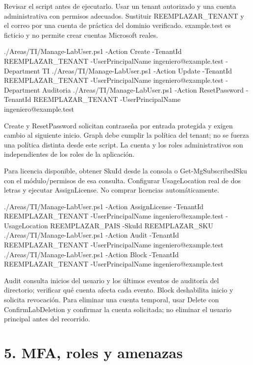 \documentclass[12pt,a4paper]{article}
\begin{document}
Revisar el script antes de ejecutarlo. Usar un tenant autorizado y una cuenta administrativa con permisos adecuados. Sustituir REEMPLAZAR\_TENANT y el correo por una cuenta de práctica del dominio verificado. \textnormal{example.test} es ficticio y no permite crear cuentas Microsoft reales.\par
{}
\begin{Comandos}
./Areas/TI/Manage-LabUser.ps1 -Action Create -TenantId REEMPLAZAR_TENANT -UserPrincipalName ingeniero@example.test -Department TI
./Areas/TI/Manage-LabUser.ps1 -Action Update -TenantId REEMPLAZAR_TENANT -UserPrincipalName ingeniero@example.test -Department Auditoria
./Areas/TI/Manage-LabUser.ps1 -Action ResetPassword -TenantId REEMPLAZAR_TENANT -UserPrincipalName ingeniero@example.test
\end{Comandos}
Create y ResetPassword solicitan contraseña por entrada protegida y exigen cambio al siguiente inicio. Graph debe cumplir la política del tenant; no se fuerza una política distinta desde este script. La cuenta y los roles administrativos son independientes de los roles de la aplicación.\par
Para licencia disponible, obtener SkuId desde la consola o Get-MgSubscribedSku con el módulo/permisos de esa consulta. Configurar UsageLocation real de dos letras y ejecutar AssignLicense. No comprar licencias automáticamente.\par
{}
\begin{Comandos}
./Areas/TI/Manage-LabUser.ps1 -Action AssignLicense -TenantId REEMPLAZAR_TENANT -UserPrincipalName ingeniero@example.test -UsageLocation REEMPLAZAR_PAIS -SkuId REEMPLAZAR_SKU
./Areas/TI/Manage-LabUser.ps1 -Action Audit -TenantId REEMPLAZAR_TENANT -UserPrincipalName ingeniero@example.test
./Areas/TI/Manage-LabUser.ps1 -Action Block -TenantId REEMPLAZAR_TENANT -UserPrincipalName ingeniero@example.test
\end{Comandos}
Audit consulta inicios del usuario y los últimos eventos de auditoría del directorio; verificar qué cuenta afecta cada evento. Block deshabilita inicio y solicita revocación. Para eliminar una cuenta temporal, usar Delete con ConfirmLabDeletion y confirmar la cuenta solicitada; no eliminar el usuario principal antes del recorrido.\par
{}\section*{5. MFA, roles y amenazas}
\end{document}
